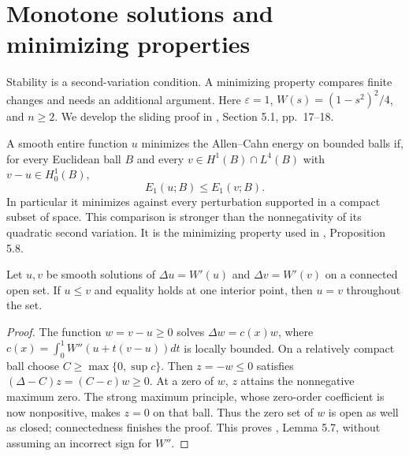 \chapter{Monotone solutions and minimizing properties}\label{sec:phase-minimizers}
Stability is a second-variation condition. A minimizing property compares finite changes and needs an additional argument. Here $\varepsilon=1$, $W(s)=(1-s^2)^2/4$, and $n\geq2$. We develop the sliding proof in \cite{ChAC}, Section 5.1, pp.~17--18.

\begin{definition}\label{def:phase-ball-minimizer}
A smooth entire function $u$ minimizes the Allen--Cahn energy on bounded balls if, for every Euclidean ball $B$ and every $v\in H^1(B)\cap L^4(B)$ with $v-u\in H^1_0(B)$,
\[
 E_1(u;B)\leq E_1(v;B).
\]
In particular it minimizes against every perturbation supported in a compact subset of space. This comparison is stronger than the nonnegativity of its quadratic second variation. It is the minimizing property used in \cite{ChAC}, Proposition 5.8.
\end{definition}

\begin{lemma}\label{lem:phase-ordered-contact}
Let $u,v$ be smooth solutions of $\Delta u=W'(u)$ and $\Delta v=W'(v)$ on a connected open set. If $u\leq v$ and equality holds at one interior point, then $u=v$ throughout the set.
\end{lemma}
\begin{proof}
The function $w=v-u\geq0$ solves $\Delta w=c(x)w$, where
$c(x)=\int_0^1W''(u+t(v-u))dt$ is locally bounded. On a relatively compact ball choose $C\geq\max\{0,\sup c\}$. Then $z=-w\leq0$ satisfies $(\Delta-C)z=(C-c)w\geq0$. At a zero of $w$, $z$ attains the nonnegative maximum zero. The strong maximum principle, whose zero-order coefficient is now nonpositive, makes $z=0$ on that ball. Thus the zero set of $w$ is open as well as closed; connectedness finishes the proof. This proves \cite{ChAC}, Lemma 5.7, without assuming an incorrect sign for $W''$.
\end{proof}

